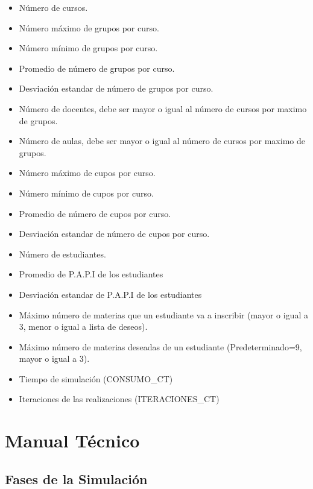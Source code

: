 \documentclass{article}
\begin{document}
\begin{itemize}
  \item Número de cursos.
  \item Número máximo de grupos por curso.
  \item Número mínimo de grupos por curso.
  \item Promedio de número de grupos por curso.
  \item Desviación estandar de número de grupos por curso.
  \item Número de docentes, debe ser mayor o igual al número de cursos por maximo de grupos.
  \item Número de aulas, debe ser mayor o igual al número de cursos por maximo de grupos.
  \item Número máximo de cupos por curso.
  \item Número mínimo de cupos por curso.
  \item Promedio de número de cupos por curso.
  \item Desviación estandar de número de cupos por curso.
  \item Número de estudiantes.
  \item Promedio de P.A.P.I de los estudiantes
  \item Desviación estandar de P.A.P.I de los estudiantes
  \item Máximo número de materias que un estudiante va a inscribir (mayor o igual a 3, 
        menor o igual a lista de deseos).
  \item Máximo número de materias deseadas de un estudiante (Predeterminado=9, 
        mayor o igual a 3).
  \item Tiempo de simulación (CONSUMO\_CT)
  \item Iteraciones de las realizaciones (ITERACIONES\_CT)
\end{itemize}



\section{Manual Técnico}\label{sec:man_t}


\subsection{Fases de la Simulación}
\end{document}
